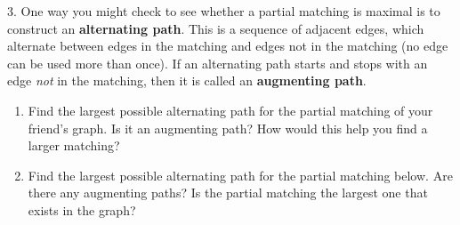 \documentclass[10pt,]{book}
\newcommand{\terminology}[1]{\textbf{#1}}
\theoremstyle{plain}
\theoremstyle{definition}
\numberwithin{equation}{chapter}
\newcommand{\vtx}[2]{node[fill,circle,inner sep=0pt, minimum size=4pt,label=#1:#2]{}}
\renewcommand{\v}{\vtx{above}{}}
\begin{document}
\begin{exerciselist}
\par\smallskip
\item[3.]\hypertarget{exercise-316}{}
        One way you might check to see whether a partial matching is maximal is to construct an \terminology{alternating path}. This is a sequence of adjacent edges, which alternate between edges in the matching and edges not in the matching (no edge can be used more than once). If an alternating path starts and stops with an edge \emph{not} in the matching, then it is called an \terminology{augmenting path}.
        \leavevmode%
\begin{enumerate}[label=(\alph*)]
\item\hypertarget{li-809}{}
        Find the largest possible alternating path for the partial matching of your friend's graph.  Is it an augmenting path?  How would this help you find a larger matching?

        \leavevmode%
\begin{figure}
\centering
{
}
\end{figure}


\item\hypertarget{li-810}{}
        Find the largest possible alternating path for the partial matching below.  Are there any augmenting paths?  Is the partial matching the largest one that exists in the graph?
\leavevmode%
\begin{figure}
\centering
{
}
\end{figure}
\end{enumerate}


\end{exerciselist}
\end{document}
